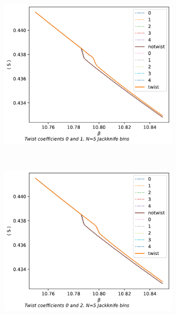 \documentclass[english,twoside,openright]{UH_TCM_MSc}
\begin{document}
\begin{figure}[htpb]
    \centering
    \begin{subfigure}[t]{0.5\textwidth}
        \centering
        \includegraphics[width=\textwidth]{final_plots/44_44_64/action_0-1.pdf}
    \end{subfigure}%
    ~ 
    \begin{subfigure}[t]{0.5\textwidth}
        \centering
        \includegraphics[width=\textwidth]{final_plots/44_44_64/action_0-2.pdf}
    \end{subfigure}

\end{figure}
\end{document}
